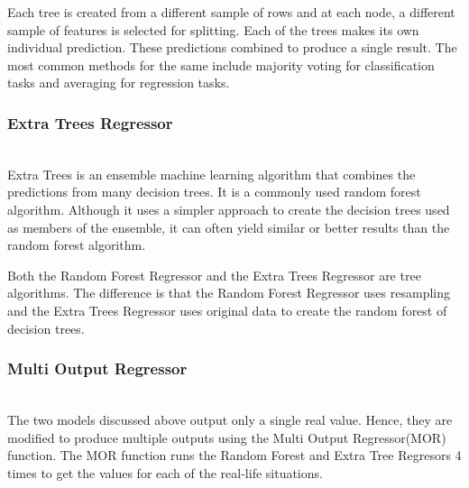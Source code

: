 \documentclass{llncs}
\begin{document}
Each tree is created from a different sample of rows and at each node, a different sample of features is selected for splitting.  Each of the trees makes its own individual prediction. These predictions combined to produce a single result. The most common methods for the same include majority voting for classification tasks and averaging for regression tasks.

\subsubsection{Extra Trees Regressor}
\hfill\\ Extra Trees is an ensemble machine learning algorithm that combines the predictions from many decision trees. It is a commonly used random forest algorithm. Although it uses a simpler approach to create the decision trees used as members of the ensemble, it can often yield similar or better results than the random forest algorithm.

Both the Random Forest Regressor and the Extra Trees Regressor are tree algorithms. The difference is that the Random Forest Regressor uses resampling and the Extra Trees Regressor uses original data to create the random forest of decision trees.

\subsubsection{Multi Output Regressor}
\hfill\\ The two models discussed above output only a single real value. Hence, they are modified to produce multiple outputs using the Multi Output Regressor(MOR) function. The MOR function runs the Random Forest and Extra Tree Regresors 4 times to get the values for each of the real-life situations. 
\end{document}
